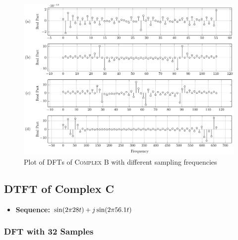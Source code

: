 \documentclass[../../course]{subfiles}
\begin{document}
\begin{figure} [H]
    \centering
     {
        \includegraphics[height = 0.8\textheight] {tikzpics/plotDftComplexB64.pdf}
    }
     {Plot of \textsc{DFT}s of \textsc{Complex B} with different sampling frequencies}
    \label{plt:dftComplexB}
\end{figure}

\pagebreak

\subsection{DTFT of Complex C} \label{ssec:dtftCplxC}

\begin{itemize} [label=]

    \item \textbf{Sequence:} $\sin(2 \pi 28 t) + j \sin(2 \pi 56.1 t)$

\end{itemize}

\subsubsection{DFT with 32 Samples}

\vfill
\end{document}
